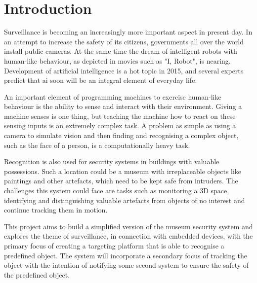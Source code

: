 \chapter{Introduction}\label{chpt:introduction}
Surveillance is becoming an increasingly more important aspect in present day. In an attempt to increase the safety of its citizens, governments all over the world install public cameras\cite{city_surveillance}. At the same time the dream of intelligent robots with human-like behaviour, as depicted in movies such as "I, Robot"\cite{imdb_robot}, is nearing. Development of artificial intelligence is a hot topic in 2015, and several experts predict that \gls{ai} soon will be an integral element of everyday life\cite{ai_microsoft}.

An important element of programming machines to exercise human-like behaviour is the ability to sense and interact with their environment. Giving a machine senses is one thing, but teaching the machine how to react on these sensing inputs is an extremely complex task\cite{facebook_ai}. A problem as simple as using a camera to simulate vision and then finding and recognising a complex object, such as the face of a person, is a computationally heavy task\cite{ai_facial_recog}.


Recognition is also used for security systems in buildings with valuable possessions. Such a location could be a museum with irreplaceable objects like paintings and other artefacts, which need to be kept safe from intruders. The challenges this system could face are tasks such as monitoring a 3D space, identifying and distinguishing valuable artefacts from objects of no interest and continue tracking them in motion.

This project aims to build a simplified version of the museum security system and explores the theme of surveillance, in connection with embedded devices, with the primary focus of creating a targeting platform that is able to recognise a predefined object. The system will incorporate a secondary focus of tracking the object with the intention of notifying some second system to ensure the safety of the predefined object.
